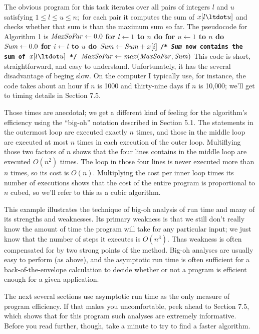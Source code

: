 The obvious program for this task iterates over all pairs of integers $l$ and $u$
satisfying $1\le l\le u\le n;$ for each pair it computes the sum of
$x[l\ltdot u]$ and checks whether that sum is than the maximum sum so far. The
pseudocode for Algorithm 1 is
\begindisplay
\vbox{
\+${\it MaxSoFar}\leftarrow 0.0$\cr
\+\bf for $l\leftarrow1$ to $n$ do\cr
\+\quad\bf for $u\leftarrow1$ to $n$ do\cr
\+\qquad${\it Sum}\leftarrow 0.0$\cr
\+\qquad\bf for $i\leftarrow l$ to $u$ do\cr
\+\qquad\quad${\it Sum}\leftarrow {\it Sum}+x[i]$\cr
\+\qquad\tt /* {\it Sum} now contains the sum of $x[l\ltdot u]$ */\cr
\+\qquad${\it MaxSoFar}\leftarrow {\it max}({\it MaxSoFar}, {\it Sum})$\cr}
\enddisplay
This code is short, straightforward, and easy to understand. Unfortunately, it
has the several disadvantage of beging slow. On the computer I typically use, for
instance, the code takes about an hour if $n$ is 1000 and thirty-nine days if $n$
is 10{,}000; we'll get to timing details in Section 7.5.

Those times are anecdotal; we get a different kind of feeling for the algorithm's
efficiency using the ``big-oh'' notation described in Section 5.1. The statements
in the outermost loop are executed exactly $n$ times, and those in the middle
loop are executed at most $n$ times in each execution of the outer loop.
Multiflying those two factors of $n$ shows that the four lines contains in the
middle loop are executed $O(n^2)$ times. The loop in those four lines is never
executed more than $n$ times, so its cost is $O(n).$ Multiplying the cost per
inner loop times its number of executions shows that the cost of the entire
program is proportional to $n$ cubed, so we'll refer to this as a cubic
algorithm.

This example illustrates the technique of big-oh analysis of run time and many
of its strengths and weaknesses. Its primary weakness is that we still don't
really know the amount of time the program will take for any particular input;
we just know that the number of steps it executes is $O(n^3).$ Thas weakness is
often compensated for by two strong points of the method. Big-oh analyses are
usually easy to perform (as above), and the asymptotic run time is often
sufficient for a back-of-the-envelope calculation to decide whether or not a
program is efficient enough for a given application.

The next several sections use asymptotic run time as the only measure of program
efficiency. If that makes you uncomfortable, peek ahead to Section 7.5, which
shows that for this program such analyses are extremely informative. Before you
read further, though, take a minute to try to find a faster algorithm.

